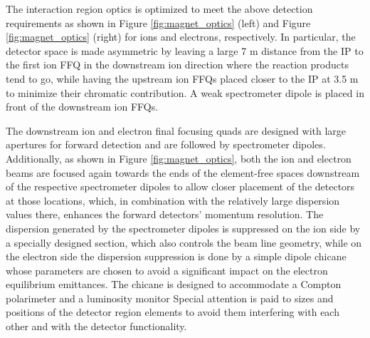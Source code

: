 The interaction region optics is optimized to meet the above detection requirements as shown in Figure \ref{fig:magnet_optics} (left) and Figure \ref{fig:magnet_optics} (right) for ions and electrons, respectively. In particular, the detector space is made asymmetric by leaving a large 7 m distance from the IP to the first ion FFQ in the downstream ion direction where the reaction products tend to go, while having the upstream ion FFQs placed closer to the IP at 3.5 m to minimize their chromatic contribution. A weak spectrometer dipole is placed in front of the downstream ion FFQs.

The downstream ion and electron final focusing quads are designed with large apertures for forward detection and are followed by spectrometer dipoles. Additionally, as shown in Figure \ref{fig:magnet_optics}, both the ion and electron beams are focused again towards the ends of the element-free spaces downstream of the respective spectrometer dipoles to allow closer placement of the detectors at those locations, which, in combination with the relatively large dispersion values there, enhances the forward detectors’ momentum resolution. The dispersion generated by the spectrometer dipoles is suppressed on the ion side by a specially designed section, which also controls the beam line geometry, while on the electron side the dispersion suppression is done by a simple dipole chicane whose parameters are chosen to avoid a significant impact on the electron equilibrium emittances. The chicane is designed to accommodate a Compton polarimeter and a luminosity monitor %
Special attention is paid to sizes and positions of the detector region elements to avoid them interfering with each other and with the detector functionality. 

